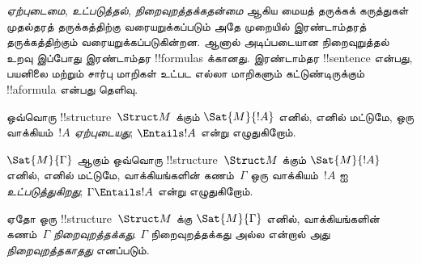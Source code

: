 \documentclass[../../../include/open-logic-section]{subfiles}
\begin{document}


\begin{explain}
\emph{ஏற்புடைமை}, \emph{உட்படுத்தல்}, \emph{நிறைவுறத்தக்கதன்மை}
ஆகிய மையத் தருக்கக் கருத்துகள் முதல்தரத் தருக்கத்திற்கு
வரையறுக்கப்படும் அதே முறையில் இரண்டாம்தரத் தருக்கத்திற்கும்
வரையறுக்கப்படுகின்றன. ஆனால் அடிப்படையான நிறைவுறுத்தல் உறவு இப்போது
இரண்டாம்தர !!{formula}s க்கானது. இரண்டாம்தர !!{sentence} என்பது,
பயனிலை மற்றும் சார்பு மாறிகள் உட்பட எல்லா மாறிகளும் கட்டுண்டிருக்கும்
!!a{formula} என்பது தெளிவு.
\end{explain}

\begin{defn}[ஏற்புடைமை]
ஒவ்வொரு !!{structure}~$\Struct M$ க்கும் $\Sat{M}{!A}$ எனில்,
எனில் மட்டுமே, ஒரு வாக்கியம்~$!A$ \emph{ஏற்புடையது};
$\Entails !A$ என்று எழுதுகிறோம்.
\end{defn}

\begin{defn}[உட்படுத்தல்]
$\Sat{M}{\Gamma}$ ஆகும் ஒவ்வொரு !!{structure}~$\Struct M$ க்கும்
$\Sat{M}{!A}$ எனில், எனில் மட்டுமே, வாக்கியங்களின் கணம்~$\Gamma$
ஒரு வாக்கியம்~$!A$ ஐ \emph{உட்படுத்துகிறது}; $\Gamma
\Entails !A$ என்று எழுதுகிறோம்.
\end{defn}

\begin{defn}[நிறைவுறத்தக்கதன்மை]
ஏதோ ஒரு !!{structure}~$\Struct M$ க்கு $\Sat{M}{\Gamma}$ எனில்,
வாக்கியங்களின் கணம்~$\Gamma$ \emph{நிறைவுறத்தக்கது}. $\Gamma$
நிறைவுறத்தக்கது அல்ல என்றால் அது \emph{நிறைவுறத்தகாதது} எனப்படும்.
\end{defn}
\end{document}
